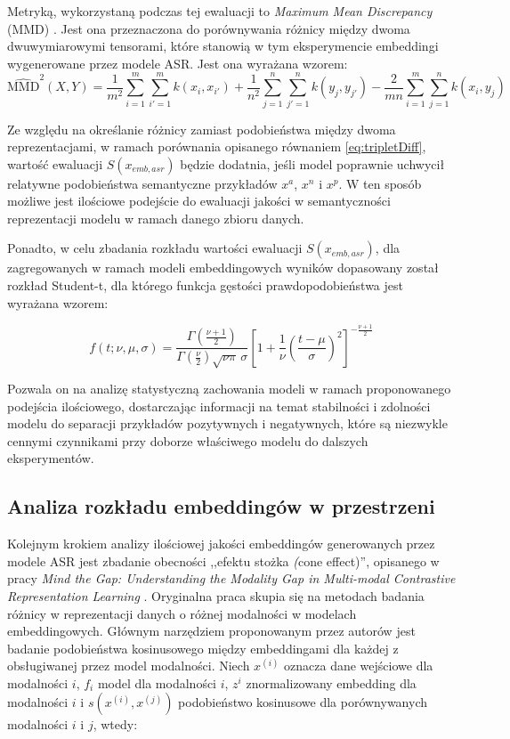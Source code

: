 Metryką, wykorzystaną podczas tej ewaluacji to \textit{Maximum Mean Discrepancy} (MMD) \cite{mmd}. Jest ona przeznaczona do porównywania różnicy między dwoma dwuwymiarowymi tensorami, które stanowią w tym eksperymencie embeddingi wygenerowane przez modele ASR. Jest ona wyrażana wzorem:
\begin{equation}
\widehat{\text{MMD}}^2(X,Y) =
\frac{1}{m^2} \sum_{i=1}^{m} \sum_{i'=1}^{m} k(x_i, x_{i'})
+ \frac{1}{n^2} \sum_{j=1}^{n} \sum_{j'=1}^{n} k(y_j, y_{j'})
- \frac{2}{mn} \sum_{i=1}^{m} \sum_{j=1}^{n} k(x_i, y_j)
\label{eq:MMD}
\end{equation}

Ze względu na określanie różnicy zamiast podobieństwa między dwoma reprezentacjami, w ramach porównania opisanego równaniem \eqref{eq:tripletDiff}, wartość ewaluacji $S(x_{emb, asr})$ będzie dodatnia, jeśli model poprawnie uchwycił relatywne podobieństwa semantyczne przykładów $x^a$, $x^n$ i $x^p$. W ten sposób możliwe jest ilościowe podejście do ewaluacji jakości w semantyczności reprezentacji modelu w ramach danego zbioru danych.

Ponadto, w celu zbadania rozkładu wartości ewaluacji $S(x_{emb, asr})$, dla zagregowanych w ramach modeli embeddingowych wyników dopasowany został rozkład Student-t, dla którego funkcja gęstości prawdopodobieństwa jest wyrażana wzorem:

\begin{equation}
f(t; \nu, \mu, \sigma) =
\frac{\Gamma\!\left(\frac{\nu+1}{2}\right)}
     {\Gamma\!\left(\frac{\nu}{2}\right) \sqrt{\nu \pi}\, \sigma}
\left[ 1 + \frac{1}{\nu} \left( \frac{t - \mu}{\sigma} \right)^2 \right]^{-\frac{\nu+1}{2}}
\label{eq:studentT}
\end{equation}

Pozwala on na analizę statystyczną zachowania modeli w ramach proponowanego podejścia ilościowego, dostarczając informacji na temat stabilności i zdolności modelu do separacji przykładów pozytywnych i negatywnych, które są niezwykle cennymi czynnikami przy doborze właściwego modelu do dalszych eksperymentów.

\subsection{Analiza rozkładu embeddingów w przestrzeni}
Kolejnym krokiem analizy ilościowej jakości embeddingów generowanych przez modele ASR jest zbadanie obecności ,,efektu stożka \textit(cone effect)'', opisanego w pracy \textit{Mind the Gap: Understanding the Modality Gap in Multi-modal Contrastive Representation Learning} \cite{liang2022mind}. Oryginalna praca skupia się na metodach badania różnicy w reprezentacji danych o różnej modalności w modelach embeddingowych. Głównym narzędziem proponowanym przez autorów jest badanie podobieństwa kosinusowego między embeddingami dla każdej z obsługiwanej przez model modalności. Niech $x^{(i)}$ oznacza dane wejściowe dla modalności $i$, $f_i$ model dla modalności $i$, $z^i$ znormalizowany embedding dla modalności $i$ i $s(x^{(i)}, x^{(j)})$ podobieństwo kosinusowe dla porównywanych modalności $i$ i $j$, wtedy:

